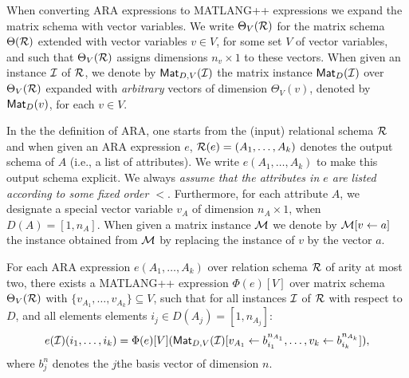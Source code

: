 When converting ARA expressions to MATLANG++ expressions we expand the matrix schema with vector variables.  We write $\Theta_V(\mathcal{R})$ for the matrix schema $\Theta(\mathcal{R})$ extended with vector variables $v\in V$, for some set $V$ of vector variables, and such that $\Theta_V(\mathcal{R})$ assigns dimensions $n_v\times 1$ to these vectors. When given an instance $\mathcal{I}$ of $\mathcal{R}$, 
we denote by  $\mathsf{Mat}_{D,V}(\mathcal{I})$ the matrix instance $\mathsf{Mat}_D(\mathcal{I})$ over $\Theta_V(\mathcal{R})$
 expanded with \textit{arbitrary} vectors of dimension $\Theta_V(v)$, denoted by $\mathsf{Mat}_{D}(v)$, for each $v\in V$.

In the the definition of ARA, one starts from the (input) relational schema $\mathcal{R}$ and when given an ARA
expression $e$, $\mathcal{R}(e)=(A_1,\ldots,A_k)$ denotes the output schema of $A$ (i.e., a list of attributes).
We write  $e(A_1,\ldots,A_k)$ to make this output schema explicit. We always \textit{assume that the attributes in $e$ are listed according to some fixed order $<$}. Furthermore, for each attribute $A$, we designate a special vector variable $v_A$ of dimension $n_A\times 1$, when $D(A)=[1,n_A]$. When given a matrix instance $\mathcal{M}$ we denote by $\mathcal{M}[v\gets a]$ the instance obtained from $\mathcal{M}$ by replacing the instance of $v$ by the vector $a$. 

\begin{lemma}\label{lem:ARA2ML}
For each ARA expression $e(A_1,\ldots,A_k)$ over relation schema $\mathcal{R}$ of arity at most two, there exists a MATLANG++ expression $\Phi(e)[V]$ over  matrix schema $\Theta_V(\mathcal{R})$ with $\{v_{A_1},\ldots,v_{A_k}\}\subseteq V$, such that for all instances $\mathcal{I}$ of $\mathcal{R}$ with respect to $D$, and all elements
elements $i_j\in D(A_j)=[1,n_{A_j}]$: 
$$
e(\mathcal{I})(i_1,\ldots,i_k)=\Phi(e)[V](\mathsf{Mat}_{D,V}(\mathcal{I})[v_{A_1}\gets b_{i_1}^{n_{A_1}},\ldots,v_k\gets b_{i_k}^{n_{A_k}}]),
$$
where $b_j^{n}$ denotes the $j$the basis vector of dimension $n$.
\end{lemma}

